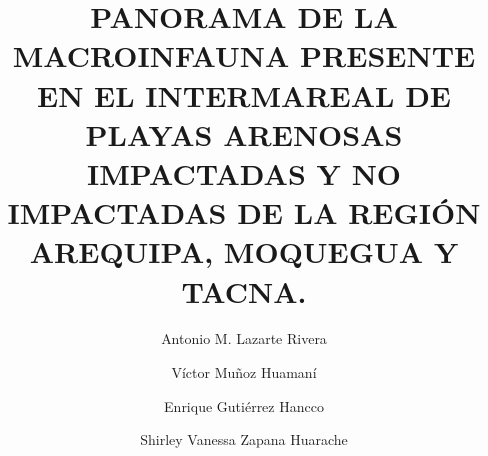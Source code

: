 \documentclass[5p,times,authoryear]{elsarticle}
\begin{document}
\begin{frontmatter}






\title{PANORAMA DE LA MACROINFAUNA PRESENTE EN EL INTERMAREAL DE PLAYAS ARENOSAS IMPACTADAS Y NO IMPACTADAS DE LA REGI\'ON AREQUIPA, MOQUEGUA Y TACNA.}



\author[First]{Antonio M. Lazarte Rivera}

\author[First]{Víctor Mu\~noz Huaman\'i}

\author[First]{Enrique Guti\'errez Hancco}

\author[Four]{Shirley Vanessa Zapana Huarache}


\address[First]{Escuela Profesional de Biolog\'ia. Universidad Nacional de San Agust\'in de Arequipa}



\address[Four]{Escuela  de Arequipa}


\end{frontmatter}
\end{document}
